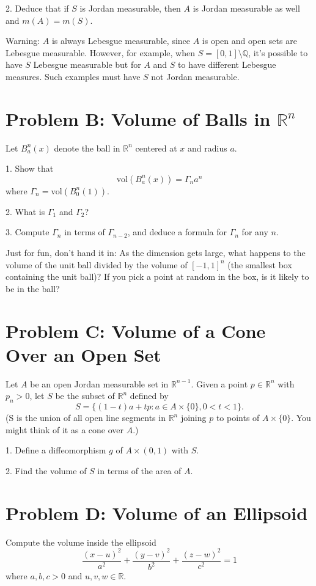 \documentclass[lang=cn,11pt]{template}
\begin{document}
2. Deduce that if \( S \) is Jordan measurable, then \( A \) is Jordan measurable as well and \( m(A) = m(S) \).

Warning: \( A \) is always Lebesgue measurable, since \( A \) is open and open sets are Lebesgue measurable. However, for example, when \( S = [0, 1] \setminus \mathbb{Q} \), it’s possible to have \( S \) Lebesgue measurable but for \( A \) and \( S \) to have different Lebesgue measures. Such examples must have \( S \) not Jordan measurable.

\section*{Problem B: Volume of Balls in \( \mathbb{R}^n \)}
Let \( B^n_a(x) \) denote the ball in \( \mathbb{R}^n \) centered at \( x \) and radius \( a \).

1. Show that
   \[
   \text{vol}(B^n_a(x)) = \Gamma_n a^n
   \]
   where \( \Gamma_n = \text{vol}(B^n_0(1)) \).

2. What is \( \Gamma_1 \) and \( \Gamma_2 \)?

3. Compute \( \Gamma_n \) in terms of \( \Gamma_{n-2} \), and deduce a formula for \( \Gamma_n \) for any \( n \).

Just for fun, don’t hand it in: As the dimension gets large, what happens to the volume of the unit ball divided by the volume of \( [-1, 1]^n \) (the smallest box containing the unit ball)? If you pick a point at random in the box, is it likely to be in the ball?

\section*{Problem C: Volume of a Cone Over an Open Set}
Let \( A \) be an open Jordan measurable set in \( \mathbb{R}^{n-1} \). Given a point \( p \in \mathbb{R}^n \) with \( p_n > 0 \), let \( S \) be the subset of \( \mathbb{R}^n \) defined by
\[
S = \{ (1 - t)a + tp : a \in A \times \{0\}, 0 < t < 1 \}.
\]
(S is the union of all open line segments in \( \mathbb{R}^n \) joining \( p \) to points of \( A \times \{0\} \). You might think of it as a cone over \( A \).)

1. Define a diffeomorphism \( g \) of \( A \times (0, 1) \) with \( S \).

2. Find the volume of \( S \) in terms of the area of \( A \).

\section*{Problem D: Volume of an Ellipsoid}
Compute the volume inside the ellipsoid
\[
\frac{(x - u)^2}{a^2} + \frac{(y - v)^2}{b^2} + \frac{(z - w)^2}{c^2} = 1
\]
where \( a, b, c > 0 \) and \( u, v, w \in \mathbb{R} \).
\end{document}
